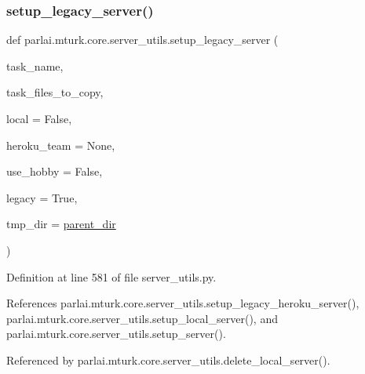 \subsubsection{\texorpdfstring{setup\+\_\+legacy\+\_\+server()}{setup\_legacy\_server()}}
{\footnotesize\ttfamily def parlai.\+mturk.\+core.\+server\+\_\+utils.\+setup\+\_\+legacy\+\_\+server (\begin{DoxyParamCaption}\item[{}]{task\+\_\+name,  }\item[{}]{task\+\_\+files\+\_\+to\+\_\+copy,  }\item[{}]{local = {\ttfamily False},  }\item[{}]{heroku\+\_\+team = {\ttfamily None},  }\item[{}]{use\+\_\+hobby = {\ttfamily False},  }\item[{}]{legacy = {\ttfamily True},  }\item[{}]{tmp\+\_\+dir = {\ttfamily \hyperlink{namespaceparlai_1_1mturk_1_1core_1_1server__utils_a193439bdbc25a32b00f1a43e6f8532d8}{parent\+\_\+dir}} }\end{DoxyParamCaption})}



Definition at line 581 of file server\+\_\+utils.\+py.



References parlai.\+mturk.\+core.\+server\+\_\+utils.\+setup\+\_\+legacy\+\_\+heroku\+\_\+server(), parlai.\+mturk.\+core.\+server\+\_\+utils.\+setup\+\_\+local\+\_\+server(), and parlai.\+mturk.\+core.\+server\+\_\+utils.\+setup\+\_\+server().



Referenced by parlai.\+mturk.\+core.\+server\+\_\+utils.\+delete\+\_\+local\+\_\+server().

